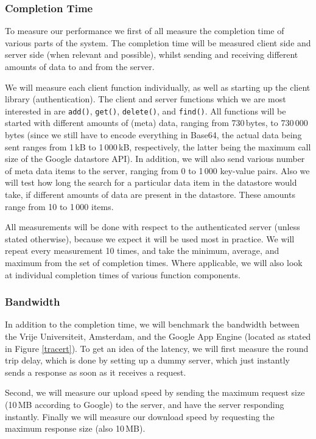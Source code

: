 \subsubsection{Completion Time}
To measure our performance we first of all measure the completion time of
various parts of the system. The completion time will be measured client side
and server side (when relevant and possible), whilst sending and receiving
different amounts of data to and from the server. 

We will measure each client function individually, as well as starting up the
client library (authentication). The client and server functions which we are
most interested in are \texttt{add()}, \texttt{get()}, \texttt{delete()}, and
\texttt{find()}. All functions will be started with different amounts of (meta)
data, ranging from 730\,bytes, to 730\,000\,bytes (since we still have to encode
everything in Base64, the actual data being sent ranges from 1\,kB to 1\,000\,kB,
respectively, the latter being the maximum call size of the Google datastore
API). In addition, we will also send various number of meta data items to the
server, ranging from 0 to 1\,000 key-value pairs. Also we will test how long
the search for a particular data item in the datastore would take, if different
amounts of data are present in the datastore. These amounts range from 10 to
1\,000 items.

All measurements will be done with respect to the authenticated server (unless
stated otherwise), because we expect it will be used most in practice. We will
repeat every measurement 10 times, and take the minimum, average, and maximum
from the set of completion times. Where applicable, we will also look at
individual completion times of various function components.

\subsubsection{Bandwidth}
In addition to the completion time, we will benchmark the bandwidth between the
Vrije Universiteit, Amsterdam, and the Google App Engine (located as stated in
Figure \ref{tracert}). To get an idea of the latency, we will first measure the
round trip delay, which is done by setting up a dummy server, which just
instantly sends a response as soon as it receives a request. 

Second, we will measure our upload speed by sending the maximum request size
(10\,MB according to Google) to the server, and have the server responding instantly.
Finally we will measure our download speed by requesting the maximum response
size (also 10\,MB).

